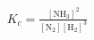 \documentclass[preview]{standalone}
\begin{document}
\begin{align*}
K_c=\frac{[\mathrm{NH_3}]^{2}}{[\mathrm{N_2}][\mathrm{H_2}]^{3}}
\end{align*}
\end{document}
